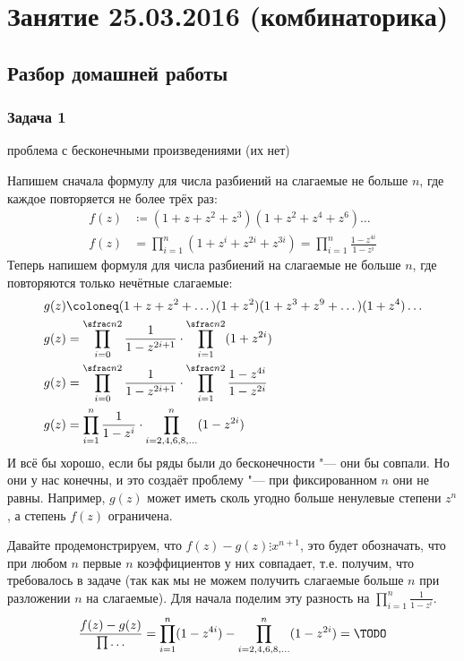 \chapter{Занятие 25.03.2016 (комбинаторика)}
\section{Разбор домашней работы}

\subsection{Задача 1}
	\TODO проблема с бесконечными произведениями (их нет)

	Напишем сначала формулу для числа разбиений на слагаемые не больше $n$,
	где каждое повторяется не более трёх раз:
	\begin{align*}
		f(z) &\coloneq (1+z+z^2+z^3)(1+z^2+z^4+z^6)\dots \\
		f(z) &= \prod_{i=1}^n (1+z^i+z^{2i}+z^{3i}) = \prod_{i=1}^n \frac{1-z^{4i}}{1-z^i}
	\end{align*}
	Теперь напишем формуля для числа разбиений на слагаемые не больше $n$,
	где повторяются только нечётные слагаемые:
	\begin{align*}
		g(z) &\coloneq (1+z+z^2+\dots)(1+z^2)(1+z^3+z^9+\dots)(1+z^4)\dots \\
		g(z) &=
			\prod_{i=0}^{\sfrac n2} \frac{1}{1-z^{2i+1}} \cdot
			\prod_{i=1}^{\sfrac n2} (1 + z^{2i}) \\
		g(z) &=
			\prod_{i=0}^{\sfrac n2} \frac{1}{1-z^{2i+1}} \cdot
			\prod_{i=1}^{\sfrac n2} \frac{1-z^{4i}}{1-z^{2i}} \\
		g(z) &=
			\prod_{i=1}^{n} \frac{1}{1-z^i} \cdot
			\prod_{i=2,4,6,8,\dots}^{n} (1-z^{2i}) \\
	\end{align*}
	И всё бы хорошо, если бы ряды были до бесконечности "--- они бы совпали.
	Но они у нас конечны, и это создаёт проблему "--- при фиксированном $n$ они не равны.
	Например, $g(z)$ может иметь сколь угодно больше ненулевые степени $z^n$, а степень $f(z)$ ограничена.

	Давайте продемонстрируем, что $f(z)-g(z) \vdots x^{n+1}$, это будет обозначать, что при любом
	$n$ первые $n$ коэффициентов у них совпадает, т.е. получим, что требовалось в задаче
	(так как мы не можем получить слагаемые больше $n$ при разложении $n$ на слагаемые).
	Для начала поделим эту разность на $\prod_{i=1}^n \frac{1}{1-z^i}$.
	\begin{gather*}
		\frac{f(z) - g(z)}{\prod \dots}
			= \prod_{i=1}^n (1-z^{4i}) - \prod_{i=2,4,6,8,\dots}^{n} (1-z^{2i}) 
			= \TODO
	\end{gather*}

